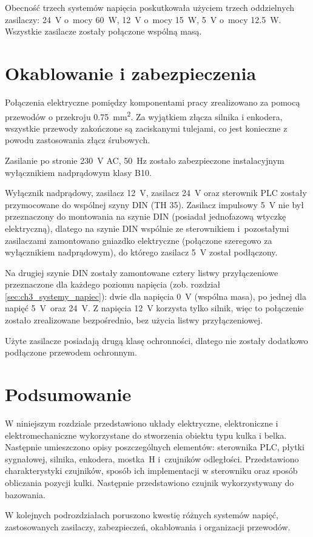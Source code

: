 Obecność trzech systemów napięcia poskutkowała użyciem trzech oddzielnych zasilaczy: \SI{24}{\volt} o~mocy \SI{60}{\watt}, \SI{12}{\volt} o~mocy \SI{15}{\watt}, \SI{5}{\volt} o~mocy \SI{12,5}{\watt}. Wszystkie zasilacze zostały połączone wspólną masą.

\section{Okablowanie i zabezpieczenia}
\label{sec:ch3_okablowanie_zabezpieczenia}

Połączenia elektryczne pomiędzy komponentami pracy zrealizowano za pomocą przewodów o przekroju \SI{0,75}{\milli\meter\squared}. Za wyjątkiem złącza silnika i enkodera, wszystkie przewody zakończone są zaciskanymi tulejami, co jest konieczne z powodu zastosowania złącz śrubowych.

Zasilanie po stronie \SI{230}{\volt} AC, \SI{50}{\hertz} zostało zabezpieczone instalacyjnym wyłącznikiem nadprądowym klasy B10.

Wyłącznik nadprądowy, zasilacz \SI{12}{\volt}, zasilacz \SI{24}{\volt} oraz sterownik PLC zostały przymocowane do wspólnej szyny DIN (TH \num{35}). Zasilacz impulsowy \SI{5}{\volt} nie był przeznaczony do montowania na szynie DIN (posiadał jednofazową wtyczkę elektryczną), dlatego na szynie DIN wspólnie ze sterownikiem i~pozostałymi zasilaczami zamontowano gniazdko elektryczne (połączone szeregowo za wyłącznikiem nadprądowym), do którego zasilacz \SI{5}{\volt} został podłączony.

Na drugiej szynie DIN zostały zamontowane cztery listwy przyłączeniowe przeznaczone dla każdego poziomu napięcia (zob. rozdział \ref{sec:ch3_systemy_napiec}): dwie dla napięcia \SI{0}{\volt} (wspólna masa), po jednej dla napięć \SI{5}{\volt}~oraz \SI{24}{\volt}. Z napięcia \SI{12}{\volt} korzysta tylko silnik, więc to połączenie zostało zrealizowane bezpośrednio, bez użycia listwy przyłączeniowej.

Użyte zasilacze posiadają drugą klasę ochronności, dlatego nie zostały dodatkowo podłączone przewodem ochronnym.


\section{Podsumowanie}

W niniejszym rozdziale przedstawiono układy elektryczne, elektroniczne i elektromechaniczne wykorzystane do stworzenia obiektu typu kulka i belka. Następnie umieszczono opisy poszczególnych elementów: sterownika PLC, płytki sygnałowej, silnika, enkodera, mostka~H i~czujników odległości. Przedstawiono charakterystyki czujników, sposób ich implementacji w sterowniku oraz sposób obliczania pozycji kulki. Następnie przedstawiono czujnik wykorzystywany do bazowania.

W kolejnych podrozdziałach poruszono kwestię różnych systemów napięć, zastosowanych zasilaczy, zabezpieczeń, okablowania i organizacji przewodów.

